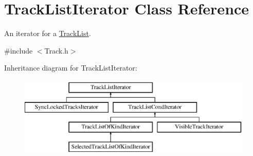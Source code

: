 \hypertarget{class_track_list_iterator}{}\section{Track\+List\+Iterator Class Reference}
\label{class_track_list_iterator}


An iterator for a \hyperlink{class_track_list}{Track\+List}.  




{\ttfamily \#include $<$Track.\+h$>$}

Inheritance diagram for Track\+List\+Iterator\+:\begin{figure}[H]
\begin{center}
\leavevmode
\includegraphics[height=3.752094cm]{class_track_list_iterator}
\end{center}
\end{figure}
